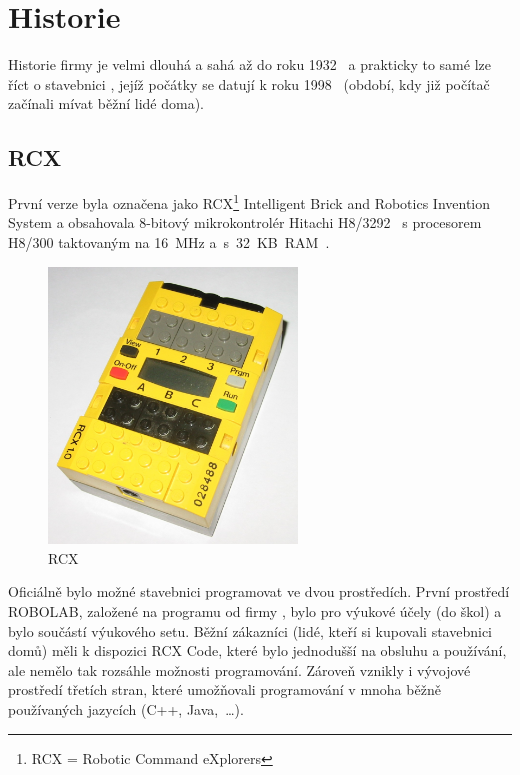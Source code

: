 \chapter{Historie \legoM}

Historie firmy \lego{ }je velmi dlouhá a sahá až do roku 1932~\cite{lego_GroupHistory1930s} a prakticky to samé lze říct o stavebnici \legoM, jejíž počátky se datují k roku 1998~\cite{lego_mindstormsHistory} (období, kdy již počítač začínali mívat běžní lidé doma).


\section{\legoM{ }RCX}

První verze byla označena jako \legoM{ }RCX\footnote{RCX = Robotic Command eXplorers} Intelligent Brick and Robotics Invention System a  obsahovala 8-bitový mikrokontrolér Hitachi H8/3292~\cite{hitachi_microcontrolerH8series} s procesorem H8/300 taktovaným na 16~MHz a~s~32~KB~RAM~\cite{legoMindstormsRCX_Manual}.

\begin{figure}[h]
	\centering
	\includegraphics[width=250px]{images/lego-mindstorms-rcx_wikipedia.jpg}
	\caption[\legoM{ }RCX]{\legoM{ }RCX\protect\footnotemark}
	\label{fig:lego-mindstorms-rcx-wikipedia}
\end{figure}


Oficiálně bylo možné stavebnici programovat ve dvou prostředích. První prostředí ROBOLAB, založené na programu \labview{ }od firmy \NI, bylo pro výukové účely (do škol) a bylo součástí výukového setu. 
Běžní zákazníci (lidé, kteří si kupovali stavebnici domů) měli k dispozici RCX Code, které bylo jednodušší na obsluhu a používání, ale nemělo tak rozsáhle možnosti programování. 
Zároveň vznikly i vývojové prostředí třetích stran, které umožňovali programování v mnoha běžně používaných jazycích (C++, Java,~\dots).

